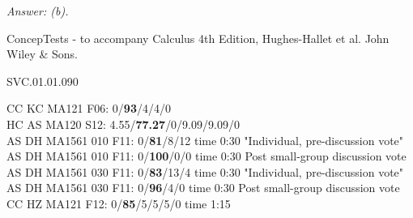 {\it Answer: (b).} 



\medskip
ConcepTests - to accompany Calculus 4th Edition, Hughes-Hallet et al. John Wiley \& Sons.

SVC.01.01.090


CC KC MA121 F06: 0/{\bf93}/4/4/0 \\
HC AS MA120 S12: 4.55/{\bf77.27}/0/9.09/9.09/0  \\
AS DH MA1561 010 F11: 0/{\bf81}/8/12 time 0:30 "Individual, pre-discussion vote" \\
AS DH MA1561 010 F11: 0/{\bf100}/0/0 time 0:30 Post small-group discussion vote \\
AS DH MA1561 030 F11: 0/{\bf83}/13/4 time 0:30 "Individual, pre-discussion vote" \\
AS DH MA1561 030 F11: 0/{\bf96}/4/0 time 0:30 Post small-group discussion vote \\
CC HZ MA121 F12: 0/{\bf85}/5/5/5/0 time 1:15  \\

